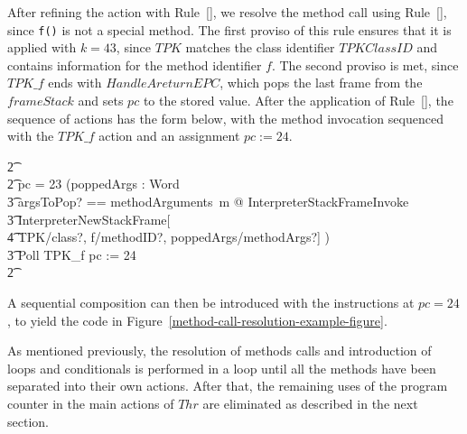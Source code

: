 After refining the action with
Rule~[], we resolve the method call
using Rule~[], since \texttt{f()}
is not a special method.
The first proviso of this rule ensures that it is applied with
$k = 43$, since $TPK$ matches the class identifier $TPKClassID$ and
contains information for the method identifier $f$.
The second proviso is met, since $TPK\_f$ ends with
$HandleAreturnEPC$, which pops the last frame from the $frameStack$
and sets $pc$ to the stored value.
After the application of Rule~[],
the sequence of actions has the form below, with the method invocation
sequenced with the $TPK\_f$ action and an assignment $pc := 24$.
\begin{circusaction}
  \t2 {} \cdots {} \\
  \t2 {} \circelse pc = 23 \circthen (\circvar poppedArgs : \seq Word \circspot \\
  \t3 \lschexpract \exists argsToPop? == methodArguments~m @ InterpreterStackFrameInvoke \rschexpract \circseq \\
  \t3 \lschexpract InterpreterNewStackFrame[ \\
  \t4 TPK/class?, f/methodID?, poppedArgs/methodArgs?] \rschexpract) \circseq \\
  \t3 Poll \circseq TPK\_f \circseq pc := 24 \\
  \t2 {} \cdots {}
\end{circusaction}
A sequential composition can then be introduced with the instructions
at $pc = 24$, to yield the code in
Figure~\ref{method-call-resolution-example-figure}.

As mentioned previously, the resolution of methods calls and
introduction of loops and conditionals is performed in a loop until
all the methods have been separated into their own actions.
After that, the remaining uses of the program counter in the main
actions of $Thr$ are eliminated as described in the next section.
